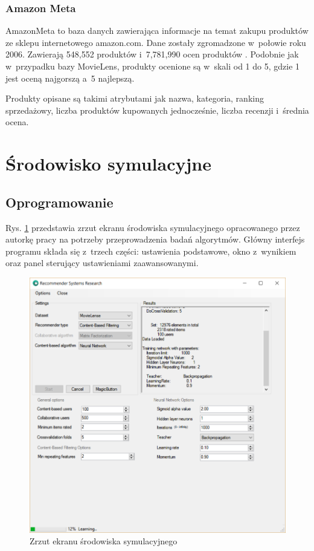 \documentclass[twoside]{iisthesis}
\begin{document}
		\subsubsection{Amazon Meta}
		AmazonMeta to baza danych zawierająca informacje na temat zakupu produktów ze sklepu internetowego amazon.com. Dane zostały zgromadzone w~połowie roku 2006. Zawierają 548,552 produktów i~7,781,990 ocen produktów \cite{amazonmeta, leskovec2007dynamics}. Podobnie jak w~przypadku bazy MovieLens, produkty ocenione są w~skali od 1 do 5, gdzie 1 jest oceną najgorszą a~5 najlepszą. 
		
		Produkty opisane są takimi atrybutami jak nazwa, kategoria, ranking sprzedażowy, liczba produktów kupowanych jednocześnie, liczba recenzji i~średnia ocena.  
		
	\section{Środowisko symulacyjne}
	
		\subsection{Oprogramowanie}
	
		Rys. \ref{fig:program} przedstawia zrzut ekranu środowiska symulacyjnego opracowanego przez autorkę pracy na potrzeby przeprowadzenia badań algorytmów. Główny interfejs programu składa się z~trzech części: ustawienia podstawowe, okno z~wynikiem oraz panel sterujący ustawieniami zaawansowanymi. 
	
		\begin{figure}[!ht] 
			\centering
			\includegraphics[width=1\textwidth]{program}
			\caption{Zrzut ekranu środowiska symulacyjnego}
			\label{fig:program}
		\end{figure}
	
\end{document}
